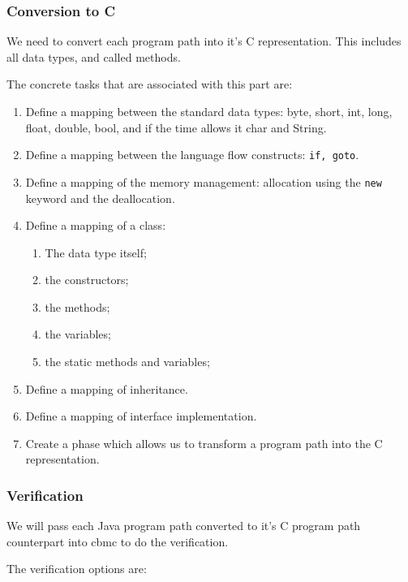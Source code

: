 \documentclass[a4paper]{article}
\begin{document}
\subsubsection{Conversion to C}
We need to convert each program path into it's C representation. This includes
all data types, and called methods. 

The concrete tasks that are associated with this part are:
\begin{enumerate}
    \item Define a mapping between the standard data types: byte, short, int, 
    long, float, double, bool, and if the time allows it char and String.
    \item Define a mapping between the language flow constructs: 
    \texttt{if, goto}.
    \item Define a mapping of the memory management: allocation using the 
    \texttt{new} keyword and the deallocation.
    \item Define a mapping of a class:
        \begin{enumerate}
            \item The data type itself;
            \item the constructors;
            \item the methods;
            \item the variables;
            \item the static methods and variables;
        \end{enumerate}
    \item Define a mapping of inheritance.
    \item Define a mapping of interface implementation.
    \item Create a phase which allows us to transform a program path into the C
    representation.
\end{enumerate}

\subsubsection{Verification}
We will pass each Java program path converted to it's C program path counterpart
into cbmc to do the verification. 

The verification options are:
\end{document}
